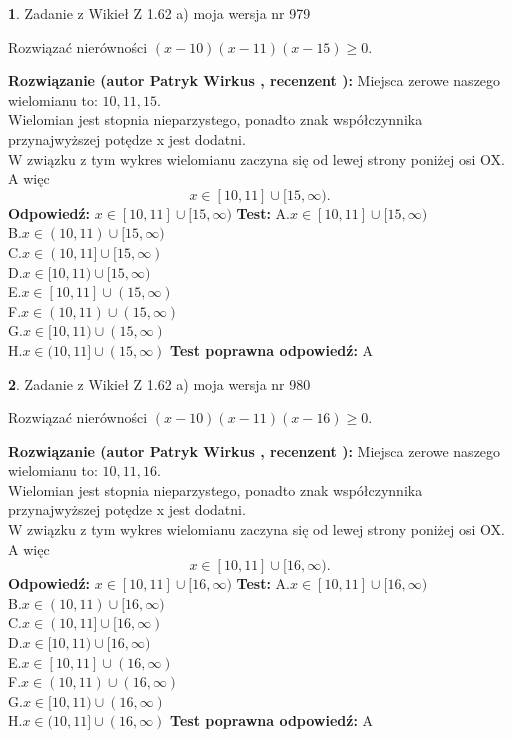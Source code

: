 \documentclass[12pt, a4paper]{article}
\theoremstyle{definition} %
\newtheorem{zad}{}
\newcommand{\zadStart}[1]{\begin{zad}#1\newline}
\newcommand{\zadStop}{\end{zad}}
\newcommand{\rozwStart}[2]{\noindent \textbf{Rozwiązanie (autor #1 , recenzent #2): }\newline}
\newcommand{\rozwStop}{\newline}
\newcommand{\odpStart}{\noindent \textbf{Odpowiedź:}\newline}
\newcommand{\odpStop}{\newline}
\newcommand{\testStart}{\noindent \textbf{Test:}\newline}
\newcommand{\testStop}{\newline}
\newcommand{\kluczStart}{\noindent \textbf{Test poprawna odpowiedź:}\newline}
\newcommand{\kluczStop}{\newline}
\begin{document}
\zadStart{Zadanie z Wikieł Z 1.62 a) moja wersja nr 979}

Rozwiązać nierówności $(x-10)(x-11)(x-15)\ge0$.
\zadStop
\rozwStart{Patryk Wirkus}{}
Miejsca zerowe naszego wielomianu to: $10, 11, 15$.\\
Wielomian jest stopnia nieparzystego, ponadto znak współczynnika przy\linebreak najwyższej potędze x jest dodatni.\\ W związku z tym wykres wielomianu zaczyna się od lewej strony poniżej osi OX. A więc $$x \in [10,11] \cup [15,\infty).$$
\rozwStop
\odpStart
$x \in [10,11] \cup [15,\infty)$
\odpStop
\testStart
A.$x \in [10,11] \cup [15,\infty)$\\
B.$x \in (10,11) \cup [15,\infty)$\\
C.$x \in (10,11] \cup [15,\infty)$\\
D.$x \in [10,11) \cup [15,\infty)$\\
E.$x \in [10,11] \cup (15,\infty)$\\
F.$x \in (10,11) \cup (15,\infty)$\\
G.$x \in [10,11) \cup (15,\infty)$\\
H.$x \in (10,11] \cup (15,\infty)$
\testStop
\kluczStart
A
\kluczStop



\zadStart{Zadanie z Wikieł Z 1.62 a) moja wersja nr 980}

Rozwiązać nierówności $(x-10)(x-11)(x-16)\ge0$.
\zadStop
\rozwStart{Patryk Wirkus}{}
Miejsca zerowe naszego wielomianu to: $10, 11, 16$.\\
Wielomian jest stopnia nieparzystego, ponadto znak współczynnika przy\linebreak najwyższej potędze x jest dodatni.\\ W związku z tym wykres wielomianu zaczyna się od lewej strony poniżej osi OX. A więc $$x \in [10,11] \cup [16,\infty).$$
\rozwStop
\odpStart
$x \in [10,11] \cup [16,\infty)$
\odpStop
\testStart
A.$x \in [10,11] \cup [16,\infty)$\\
B.$x \in (10,11) \cup [16,\infty)$\\
C.$x \in (10,11] \cup [16,\infty)$\\
D.$x \in [10,11) \cup [16,\infty)$\\
E.$x \in [10,11] \cup (16,\infty)$\\
F.$x \in (10,11) \cup (16,\infty)$\\
G.$x \in [10,11) \cup (16,\infty)$\\
H.$x \in (10,11] \cup (16,\infty)$
\testStop
\kluczStart
A
\kluczStop
\end{document}
